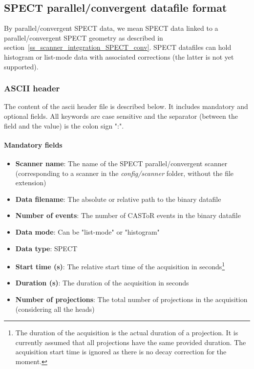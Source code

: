 \documentclass[a4paper, 11pt]{article}
\begin{document}
\newpage
\subsection{SPECT parallel/convergent datafile format}
\label{ss_input_SPECT_conv}

By parallel/convergent SPECT data, we mean SPECT data linked to a parallel/convergent SPECT geometry as described in section~\ref{ss_scanner_integration_SPECT_conv}.
SPECT datafiles can hold histogram or list-mode data with associated corrections (the latter is not yet supported).

\subsubsection{ASCII header}

The content of the ascii header file is described below. It includes mandatory and optional fields. All keywords are case sensitive and the
separator (between the field and the value) is the colon sign ":".


\paragraph{Mandatory fields}
\begin{itemize}
  \item \textbf{Scanner name}: The name of the SPECT parallel/convergent scanner (corresponding to a scanner in the \textit{config/scanner} folder, without
        the file extension)
  \item \textbf{Data filename}: The absolute or relative path to the binary datafile
  \item \textbf{Number of events}: The number of CASToR events in the binary datafile
  \item \textbf{Data mode}: Can be "list-mode" or "histogram"
  \item \textbf{Data type}: SPECT
  \item \textbf{Start time (s)}: The relative start time of the acquisition in seconds\footnote{\label{noteduration}The duration of the acquisition is the actual duration of a projection. It is currently assumed that all projections have the same provided duration. The acquisition start time is ignored as there is no decay correction for the moment.}
  \item \textbf{Duration (s)}: The duration of the acquisition in seconds
  \item \textbf{Number of projections}: The total number of projections in the acquisition (considering all the heads)
\end{itemize}
\end{document}
